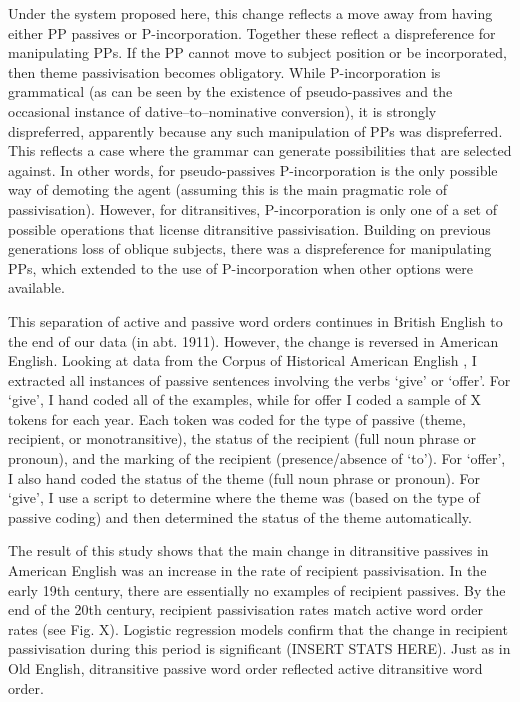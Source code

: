 	Under the system proposed here, this change reflects a move away from having either PP passives or P-incorporation. Together these reflect a dispreference for manipulating PPs. If the PP cannot move to subject position or be incorporated, then theme passivisation becomes obligatory. While P-incorporation is grammatical (as can be seen by the existence of pseudo-passives and the occasional instance of dative--to--nominative conversion), it is strongly dispreferred, apparently because any such manipulation of PPs was dispreferred. This reflects a case where the grammar can generate possibilities that are selected against. In other words, for pseudo-passives P-incorporation is the only possible way of demoting the agent (assuming this is the main pragmatic role of passivisation). However, for ditransitives, P-incorporation is only one of a set of possible operations that license ditransitive passivisation. Building on previous generations loss of oblique subjects, there was a dispreference for manipulating PPs, which extended to the use of P-incorporation when other options were available.

	This separation of active and passive word orders continues in British English to the end of our data (in abt. 1911). However, the change is reversed in American English. Looking at data from the Corpus of Historical American English \citep{DavDavies.2010}, I extracted all instances of passive sentences involving the verbs `give' or `offer'. For `give', I hand coded all of the examples, while for offer I coded a sample of X tokens for each year. Each token was coded for the type of passive (theme, recipient, or monotransitive), the status of the recipient (full noun phrase or pronoun), and the marking of the recipient (presence/absence of `to'). For `offer', I also hand coded the status of the theme (full noun phrase or pronoun). For `give', I use a script to determine where the theme was (based on the type of passive coding) and then determined the status of the theme automatically.
	
	The result of this study shows that the main change in ditransitive passives in American English was an increase in the rate of recipient passivisation. In the early 19th century, there are essentially no examples of recipient passives. By the end of the 20th century, recipient passivisation rates match active word order rates (see Fig. X). Logistic regression models confirm that the change in recipient passivisation during this period is significant (INSERT STATS HERE). Just as in Old English, ditransitive passive word order reflected active ditransitive word order.

